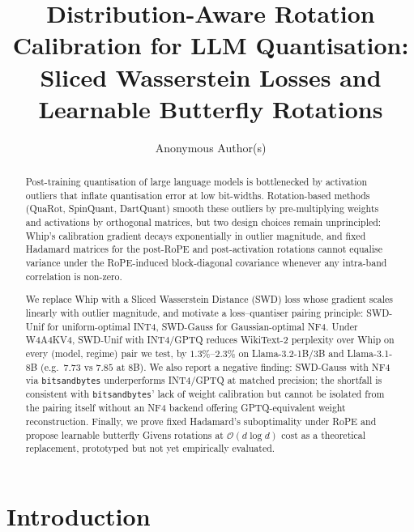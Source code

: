 \documentclass[11pt,a4paper]{article}
\title{Distribution-Aware Rotation Calibration for LLM Quantisation:\\
Sliced Wasserstein Losses and Learnable Butterfly Rotations}
\author{
  Anonymous Author(s)
}
\date{}
\begin{document}
\maketitle

\begin{abstract}
Post-training quantisation of large language models is bottlenecked by activation outliers that inflate quantisation error at low bit-widths. Rotation-based methods (QuaRot, SpinQuant, DartQuant) smooth these outliers by pre-multiplying weights and activations by orthogonal matrices, but two design choices remain unprincipled: Whip's calibration gradient decays exponentially in outlier magnitude, and fixed Hadamard matrices for the post-RoPE and post-activation rotations cannot equalise variance under the RoPE-induced block-diagonal covariance whenever any intra-band correlation is non-zero.

We replace Whip with a Sliced Wasserstein Distance (SWD) loss whose gradient scales linearly with outlier magnitude, and motivate a loss--quantiser pairing principle: SWD-Unif for uniform-optimal INT4, SWD-Gauss for Gaussian-optimal NF4. Under W4A4KV4, SWD-Unif with INT4/GPTQ reduces WikiText-2 perplexity over Whip on every (model, regime) pair we test, by $1.3\%$--$2.3\%$ on Llama-3.2-1B/3B and Llama-3.1-8B (e.g.\ $7.73$ vs $7.85$ at 8B). We also report a negative finding: SWD-Gauss with NF4 via \texttt{bitsandbytes} underperforms INT4/GPTQ at matched precision; the shortfall is consistent with \texttt{bitsandbytes}' lack of weight calibration but cannot be isolated from the pairing itself without an NF4 backend offering GPTQ-equivalent weight reconstruction. Finally, we prove fixed Hadamard's suboptimality under RoPE and propose learnable butterfly Givens rotations at $\mathcal{O}(d\log d)$ cost as a theoretical replacement, prototyped but not yet empirically evaluated.
\end{abstract}




\section{Introduction}
\end{document}
